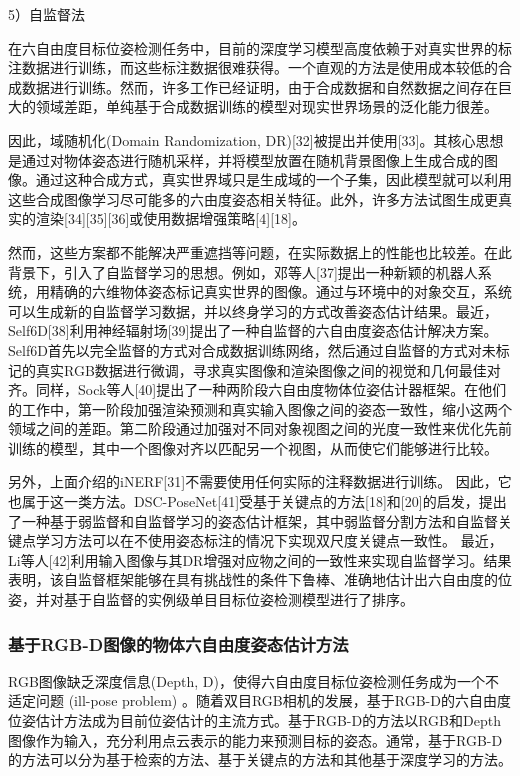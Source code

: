 \documentclass[12pt]{article}
\begin{document}
5）自监督法

在六自由度目标位姿检测任务中，目前的深度学习模型高度依赖于对真实世界的标注数据进行训练，而这些标注数据很难获得。一个直观的方法是使用成本较低的合成数据进行训练。然而，许多工作已经证明，由于合成数据和自然数据之间存在巨大的领域差距，单纯基于合成数据训练的模型对现实世界场景的泛化能力很差。

因此，域随机化(Domain Randomization, DR)[32]被提出并使用[33]。其核心思想是通过对物体姿态进行随机采样，并将模型放置在随机背景图像上生成合成的图像。通过这种合成方式，真实世界域只是生成域的一个子集，因此模型就可以利用这些合成图像学习尽可能多的六由度姿态相关特征。此外，许多方法试图生成更真实的渲染[34][35][36]或使用数据增强策略[4][18]。

然而，这些方案都不能解决严重遮挡等问题，在实际数据上的性能也比较差。在此背景下，引入了自监督学习的思想。例如，邓等人[37]提出一种新颖的机器人系统，用精确的六维物体姿态标记真实世界的图像。通过与环境中的对象交互，系统可以生成新的自监督学习数据，并以终身学习的方式改善姿态估计结果。最近，Self6D[38]利用神经辐射场[39]提出了一种自监督的六自由度姿态估计解决方案。Self6D首先以完全监督的方式对合成数据训练网络，然后通过自监督的方式对未标记的真实RGB数据进行微调，寻求真实图像和渲染图像之间的视觉和几何最佳对齐。同样，Sock等人[40]提出了一种两阶段六自由度物体位姿估计器框架。在他们的工作中，第一阶段加强渲染预测和真实输入图像之间的姿态一致性，缩小这两个领域之间的差距。第二阶段通过加强对不同对象视图之间的光度一致性来优化先前训练的模型，其中一个图像对齐以匹配另一个视图，从而使它们能够进行比较。

另外，上面介绍的iNERF[31]不需要使用任何实际的注释数据进行训练。 因此，它也属于这一类方法。DSC-PoseNet[41]受基于关键点的方法[18]和[20]的启发，提出了一种基于弱监督和自监督学习的姿态估计框架，其中弱监督分割方法和自监督关键点学习方法可以在不使用姿态标注的情况下实现双尺度关键点一致性。 最近，Li等人[42]利用输入图像与其DR增强对应物之间的一致性来实现自监督学习。结果表明，该自监督框架能够在具有挑战性的条件下鲁棒、准确地估计出六自由度的位姿，并对基于自监督的实例级单目目标位姿检测模型进行了排序。 

\subsubsection{基于RGB-D图像的物体六自由度姿态估计方法}

RGB图像缺乏深度信息(Depth, D)，使得六自由度目标位姿检测任务成为一个不适定问题 (ill-pose problem) 。随着双目RGB相机的发展，基于RGB-D的六自由度位姿估计方法成为目前位姿估计的主流方式。基于RGB-D的方法以RGB和Depth图像作为输入，充分利用点云表示的能力来预测目标的姿态。通常，基于RGB-D的方法可以分为基于检索的方法、基于关键点的方法和其他基于深度学习的方法。
\end{document}
